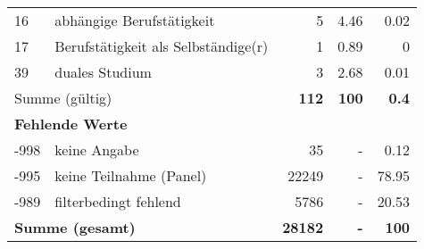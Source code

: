 \begin{longtable}{lXrrr}
     16 &
     \multicolumn{1}{X}{ abhängige Berufstätigkeit   } &


       \num{5} &
       \num[round-mode=places,round-precision=2]{4.46} &
         \num[round-mode=places,round-precision=2]{0.02} \\

     17 &
     \multicolumn{1}{X}{ Berufstätigkeit als Selbständige(r)   } &


       \num{1} &
       \num[round-mode=places,round-precision=2]{0.89} &
         \num[round-mode=places,round-precision=2]{0} \\

     39 &
     \multicolumn{1}{X}{ duales Studium   } &


       \num{3} &
       \num[round-mode=places,round-precision=2]{2.68} &
         \num[round-mode=places,round-precision=2]{0.01} \\
     \midrule
     \multicolumn{2}{l}{Summe (gültig)} &
       \textbf{\num{112}} &
     \textbf{\num{100}} &
       \textbf{\num[round-mode=places,round-precision=2]{0.4}} \\
     \multicolumn{5}{l}{\textbf{Fehlende Werte}}\\
       -998 &
       keine Angabe &
         \num{35} &
        - &
         \num[round-mode=places,round-precision=2]{0.12} \\
       -995 &
       keine Teilnahme (Panel) &
         \num{22249} &
        - &
         \num[round-mode=places,round-precision=2]{78.95} \\
       -989 &
       filterbedingt fehlend &
         \num{5786} &
        - &
         \num[round-mode=places,round-precision=2]{20.53} \\
     \midrule
     \multicolumn{2}{l}{\textbf{Summe (gesamt)}} &
          \textbf{\num{28182}} &
        \textbf{-} &
        \textbf{\num{100}} \\
     \bottomrule
     \end{longtable}
     
